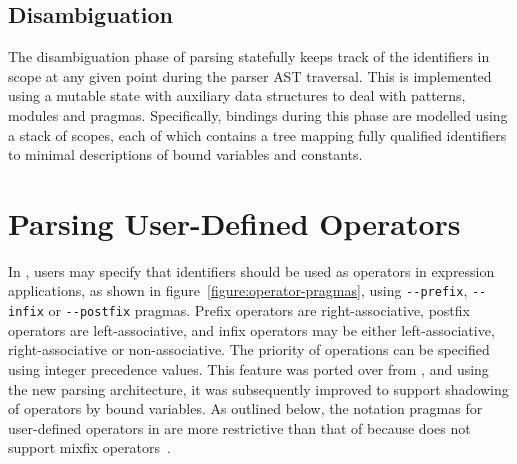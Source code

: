\subsection{Disambiguation}

The disambiguation phase of parsing statefully keeps track of the identifiers in scope at any given point during the parser \ac{AST} traversal.
This is implemented using a mutable state with auxiliary data structures to deal with patterns, modules and pragmas.
Specifically, bindings during this phase are modelled using a stack of scopes, each of which contains a tree mapping fully qualified identifiers to minimal descriptions of bound variables and constants.


\section{Parsing User-Defined Operators}

In \Beluga, users may specify that identifiers should be used as operators in expression applications, as shown in figure~\ref{figure:operator-pragmas}, using \verb|--prefix|, \verb|--infix| or \verb|--postfix| pragmas.
Prefix operators are right-associative, postfix operators are left-associative, and infix operators may be either left-associative, right-associative or non-associative.
The priority of operations can be specified using integer precedence values.
This feature was ported over from \Twelf, and using the new parsing architecture, it was subsequently improved to support shadowing of operators by bound variables.
As outlined below, the notation pragmas for user-defined operators in \Beluga are more restrictive than that of \Agda because \Beluga does not support mixfix operators~\cite{danielsson2008parsing}.

